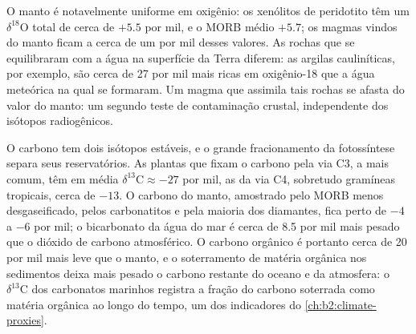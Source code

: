 O manto é notavelmente uniforme em oxigênio: os xenólitos de peridotito têm um
$\delta^{18}\mathrm{O}$ total de cerca de $+5.5$ por mil, e o MORB médio $+5.7$; os magmas
vindos do manto ficam a cerca de um por mil desses valores. As rochas que se
equilibraram com a água na superfície da Terra diferem: as argilas cauliníticas, por
exemplo, são cerca de 27 por mil mais ricas em oxigênio-18 que a água meteórica na qual
se formaram. Um magma que assimila tais rochas se afasta do valor do
manto: um segundo teste de contaminação crustal, independente dos isótopos
radiogênicos.

O carbono tem dois isótopos estáveis, e o grande fracionamento da fotossíntese
separa seus reservatórios. As plantas que fixam o carbono pela via C3, a mais comum, têm em média
$\delta^{13}\mathrm{C} \approx -27$ por mil, as da via C4, sobretudo gramíneas
tropicais, cerca de $-13$. O carbono do manto, amostrado pelo MORB menos desgaseificado,
pelos carbonatitos e pela maioria dos diamantes, fica perto de $-4$ a $-6$ por mil; o
bicarbonato da água do mar é cerca de 8.5 por mil mais pesado que o dióxido de carbono
atmosférico. O carbono orgânico é portanto cerca de 20 por mil mais leve que o manto, e
o soterramento de matéria orgânica nos sedimentos deixa mais pesado o carbono restante do
oceano e da atmosfera: o $\delta^{13}\mathrm{C}$ dos carbonatos marinhos
registra a fração do carbono soterrada como matéria orgânica ao longo do tempo, um dos
indicadores do \cref{ch:b2:climate-proxies}.

\begin{omfigure}
\centering
{}
\par{}
\end{omfigure}

